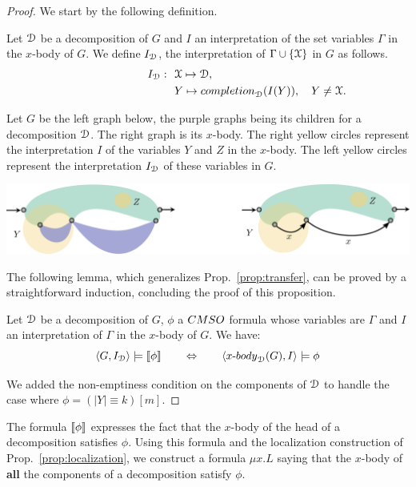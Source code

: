 \begin{proof} We start by the following definition.
\begin{definition} Let  $\mathcal D$ be a decomposition of  $G$ and $I$  an interpretation of the  set variables $\Gamma$ in  the $x$-body of $G$. We define $I_\mathcal D$, the interpretation of $\Gamma\cup\left\{\mathcal X\right\}$ in  $G$ as follows.
\begin{align*}
\qquad\qquad \qquad \quad I_\cD:\ \ & \cX \mapsto \cD, \\
      &   Y \mapsto \mathsf{completion}_\cD(I(Y)), \quad Y\neq \cX.
\end{align*} 
\end{definition}
Let $G$ be the left graph below, the purple graphs being its children for a decomposition $\mathcal D$. The right graph is its $x$-body. The right yellow circles represent the interpretation $I$ of the variables $Y$ and $Z$ in the $x$-body. The left yellow circles represent the interpretation $I_\mathcal D$ of these variables in $G$. 
\begin{center}
\includegraphics[scale=.12]{Pictures/transfer-interpretation}
\end{center}
The following lemma, which generalizes Prop.~\ref{prop:transfer}, can be proved by a straightforward induction, concluding the proof of this proposition.
 \begin{lemma}
 Let $\mathcal D$ be a decomposition of $G$, $\phi$ a $\CMSO$ formula whose variables are $\Gamma$ and $I$ an interpretation of  $\Gamma$ in the $x$-body of $G$. We have:
 $$ \langle G, I_\cD\rangle \models \tms{\phi} \qquad \Leftrightarrow \qquad\langle x\text{-}\mathsf{body}_\cD(G), I\rangle \models \phi$$ 
 \end{lemma}
We added the non-emptiness condition on the components of $\mathcal D$ to handle the case where $\phi=(|Y|\equiv k)[m]$.
 \end{proof}

The formula  $\left\llbracket {\phi}\right\rrbracket$ expresses the fact that the $x$-body of the head of a decomposition satisfies $\phi$. Using this formula and the localization construction of Prop.~\ref{prop:localization}, we construct a formula $\mu x. L$ saying that the $x$-body of \textbf{all} the components of a decomposition satisfy $\phi$.

